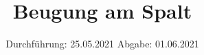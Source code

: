 

\subject{V406}
\title{Beugung am Spalt}
\date{%
  Durchführung: 25.05.2021
  \hspace{3em}
  Abgabe: 01.06.2021
}



\maketitle
\thispagestyle{empty}
\tableofcontents
\newpage






\printbibliography{}


